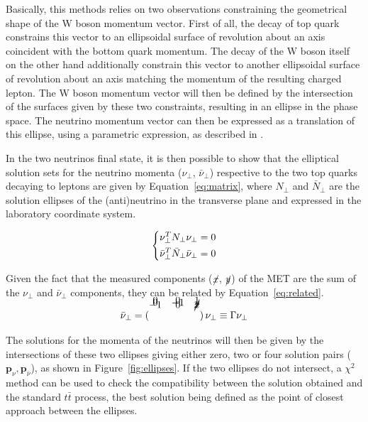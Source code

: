 \documentclass[a4paper, 10pt, openright]{report}
\begin{document}
\begin{itemize}
Basically, this methods relies on two observations constraining the geometrical shape of the W boson momentum vector. First of all, the decay of top quark constrains this vector to an ellipsoidal surface of revolution about an axis coincident with the bottom quark momentum. The decay of the W boson itself on the other hand additionally constrain this vector to another ellipsoidal surface of revolution about an axis matching the momentum of the resulting charged lepton. The W boson momentum vector will then be defined by the intersection of the surfaces given by these two constraints, resulting in an ellipse in the phase space. The neutrino momentum vector can then be expressed as a translation of this ellipse, using a parametric expression, as described in \cite{Betchart}.

In the two neutrinos final state, it is then possible to show that the elliptical solution sets for the neutrino momenta ($\nu_\perp$, $\bar \nu_\perp$) respective to the two top quarks decaying to leptons are given by Equation~\ref{eq:matrix}, where $N_\perp$ and $\bar N_\perp$ are the solution ellipses of the (anti)neutrino in the transverse plane and expressed in the laboratory coordinate system.


\begin{equation}
\label{eq:matrix}
\begin{dcases}
\nu_\perp^T N_\perp \nu_\perp = 0 \\
\bar \nu_\perp^T \bar N_\perp \bar \nu_\perp = 0
\end{dcases}
\end{equation}

Given the fact that the measured components ($\cancel{x}$, $\cancel{y}$) of the \ac{MET} are the sum of the $\nu_\perp$ and $\bar \nu_\perp$ components, they can be related by Equation~\ref{eq:related}.

\begin{equation}
\label{eq:related}
\bar \nu_\perp = \begin{pmatrix}
\\[-1.3cm] -1 & 0 & \cancel{x} \\[-0.5cm]
0 & -1 & \cancel{y} \\[-0.5cm]
0 & 0 & 1
\end{pmatrix} \nu_\perp \equiv \Gamma \nu_\perp
\end{equation}

The solutions for the momenta of the neutrinos will then be given by the intersections of these two ellipses giving either zero, two or four solution pairs ($\bm{p}_\nu, \bm{p}_{\bar \nu}$), as shown in Figure~\ref{fig:ellipses}. If the two ellipses do not intersect, a $\chi^2$ method can be used to check the compatibility between the solution obtained and the standard $t \bar t$ process, the best solution being defined as the point of closest approach between the ellipses.


\end{itemize}
\end{document}
